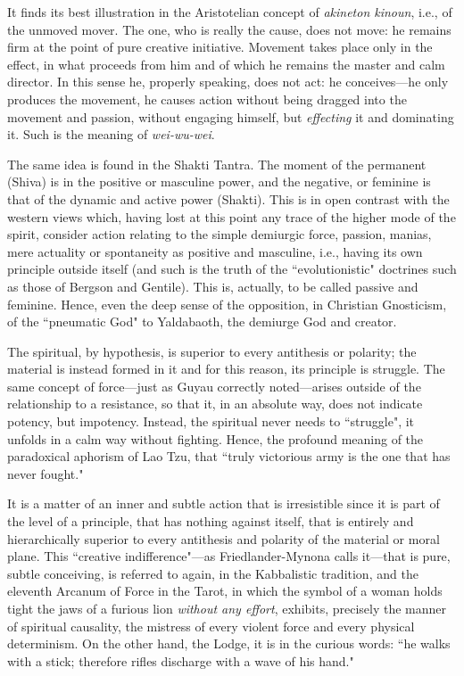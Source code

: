 It finds its best illustration in the Aristotelian concept of \textit{akineton kinoun}, i.e., of the unmoved mover. The one, who is really the cause, does not move: he remains firm at the point of pure creative initiative. Movement takes place only in the effect, in what proceeds from him and of which he remains the master and calm director. In this sense he, properly speaking, does not act: he conceives—he only produces the movement, he causes action without being dragged into the movement and passion, without engaging himself, but \textit{effecting} it and dominating it. Such is the meaning of \textit{wei-wu-wei}.

The same idea is found in the Shakti Tantra. The moment of the permanent (Shiva) is in the positive or masculine power, and the negative, or feminine is that of the dynamic and active power (Shakti). This is in open contrast with the western views which, having lost at this point any trace of the higher mode of the spirit, consider action relating to the simple demiurgic force, passion, manias, mere actuality or spontaneity as positive and masculine, i.e., having its own principle outside itself (and such is the truth of the ``evolutionistic" doctrines such as those of Bergson and Gentile). This is, actually, to be called passive and feminine. Hence, even the deep sense of the opposition, in Christian Gnosticism, of the ``pneumatic God" to Yaldabaoth, the demiurge God and creator.

The spiritual, by hypothesis, is superior to every antithesis or polarity; the material is instead formed in it and for this reason, its principle is struggle. The same concept of force—just as Guyau correctly noted—arises outside of the relationship to a resistance, so that it, in an absolute way, does not indicate potency, but impotency. Instead, the spiritual never needs to ``struggle", it unfolds in a calm way without fighting. Hence, the profound meaning of the paradoxical aphorism of Lao Tzu, that ``truly victorious army is the one that has never fought."

It is a matter of an inner and subtle action that is irresistible since it is part of the level of a principle, that has nothing against itself, that is entirely and hierarchically superior to every antithesis and polarity of the material or moral plane. This ``creative indifference"—as Friedlander-Mynona calls it—that is pure, subtle conceiving, is referred to again, in the Kabbalistic tradition, and the eleventh Arcanum of Force in the Tarot, in which the symbol of a woman holds tight the jaws of a furious lion \textit{without any effort}, exhibits, precisely the manner of spiritual causality, the mistress of every violent force and every physical determinism. On the other hand, the Lodge, it is in the curious words: ``he walks with a stick; therefore rifles discharge with a wave of his hand."


